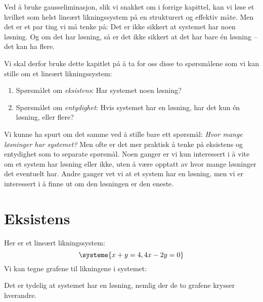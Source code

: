 

\label{ch:eksistens-entydighet}

Ved å bruke gausseliminasjon, slik vi snakket om i forrige kapittel,
kan vi løse et hvilket som helst lineært likningssystem på en
strukturert og effektiv måte.  Men det er et par ting vi må tenke på:
Det er ikke sikkert at systemet har noen løsning.  Og om det har
løsning, så er det ikke sikkert at det har bare én løsning -- det kan
ha flere.

Vi skal derfor bruke dette kapitlet på å ta for oss disse to
spørsmålene som vi kan stille om et lineært likningssystem:
\begin{enumerate}
\item Spørsmålet om \emph{eksistens}: Har systemet noen løsning?
\item Spørsmålet om \emph{entydighet}: Hvis systemet har en løsning,
har det kun én løsning, eller flere?
\end{enumerate}

Vi kunne ha spurt om det samme ved å stille bare ett spørsmål:
\emph{Hvor mange løsninger har systemet?}  Men ofte er det mer
praktisk å tenke på eksistens og entydighet som to separate spørsmål.
Noen ganger er vi kun interessert i å vite om et system har løsning
eller ikke, uten å være opptatt av hvor mange løsninger det eventuelt
har.  Andre ganger vet vi at et system har en løsning, men vi er
interessert i å finne ut om den løsningen er den eneste.


\section*{Eksistens}

Her er et lineært likningssystem:
\[
\systeme{
  x + y = 4,
  4x - 2y = 0
}
\]
Vi kan tegne grafene til likningene i systemet:
\begin{center}
\end{center}
Det er tydelig at systemet har en løsning, nemlig der de to grafene
krysser hverandre.

